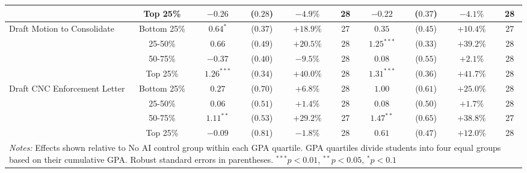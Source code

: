 \begin{table}[!htbp]
\begin{tabular}{lccccccccc}
& Top 25\% & $-0.26$ & ($0.28$) & $-4.9\%$ & 28 & $-0.22$ & ($0.37$) & $-4.1\%$ & 28 \\
\hline
\multirow{4}{*}{Draft Motion to Consolidate} & Bottom 25\% & $0.64^{*}$ & ($0.37$) & $+18.9\%$ & 27 & $0.35$ & ($0.45$) & $+10.4\%$ & 27 \\
& 25-50\% & $0.66$ & ($0.49$) & $+20.5\%$ & 28 & $1.25^{***}$ & ($0.33$) & $+39.2\%$ & 28 \\
& 50-75\% & $-0.37$ & ($0.40$) & $-9.5\%$ & 28 & $0.08$ & ($0.55$) & $+2.1\%$ & 28 \\
& Top 25\% & $1.26^{***}$ & ($0.34$) & $+40.0\%$ & 28 & $1.31^{***}$ & ($0.36$) & $+41.7\%$ & 28 \\
\hline
\multirow{4}{*}{Draft CNC Enforcement Letter} & Bottom 25\% & $0.27$ & ($0.70$) & $+6.8\%$ & 28 & $1.00$ & ($0.61$) & $+25.0\%$ & 28 \\
& 25-50\% & $0.06$ & ($0.51$) & $+1.4\%$ & 28 & $0.08$ & ($0.50$) & $+1.7\%$ & 28 \\
& 50-75\% & $1.11^{**}$ & ($0.53$) & $+29.2\%$ & 27 & $1.47^{**}$ & ($0.65$) & $+38.8\%$ & 27 \\
& Top 25\% & $-0.09$ & ($0.81$) & $-1.8\%$ & 28 & $0.61$ & ($0.47$) & $+12.0\%$ & 28 \\
\hline
\multicolumn{10}{p{0.95\linewidth}}{\footnotesize \textit{Notes:} Effects shown relative to No AI control group within each GPA quartile. GPA quartiles divide students into four equal groups based on their cumulative GPA. Robust standard errors in parentheses. $^{***}p<0.01$, $^{**}p<0.05$, $^{*}p<0.1$}
\end{tabular}
\end{table}
